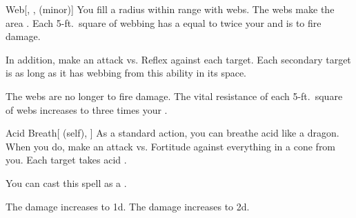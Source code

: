 \lowercase{\hypertarget{spell:Web}{}}\label{spell:Web}
\begin{freeability}[Rank 3]{\hypertarget{spell:Web}{Web}}[, ,  (minor)]
You fill a \areasmall radius  within \rngmed range with webs.
The webs make the area .
Each 5-ft.\ square of webbing has a  equal to twice your  and is  to fire damage.

In addition, make an attack vs. Reflex against each target.
\hit Each secondary target is  as long as it has webbing from this ability in its space.

\rankline
{} The webs are no longer  to fire damage.
 The vital resistance of each 5-ft.\ square of webs increases to three times your .
\end{freeability}
\vspace{0.25em}



\lowercase{\hypertarget{spell:Acid Breath}{}}\label{spell:Acid Breath}
\begin{attuneability}[Rank 4]{\hypertarget{spell:Acid Breath}{Acid Breath}}[ (self), ]
As a standard action, you can breathe acid like a dragon.
When you do, make an attack vs. Fortitude against everything in a \arealarge cone from you.
\hit Each target takes acid .

You can cast this spell as a .

\rankline
{} The damage increases to  \plus1d.
 The damage increases to  \plus2d.
\end{attuneability}
\vspace{0.25em}



